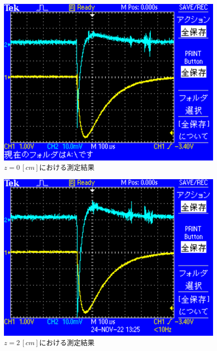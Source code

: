 \begin{figure}[H]
    \centering
    \includegraphics[scale=0.5]{images-1.pdf}
    \caption{$z=0\,[cm]$における測定結果}
\end{figure}

\begin{figure}[H]
    \centering
    \includegraphics[scale=0.5]{images-2.pdf}
    \caption{$z=2\,[cm]$における測定結果}
\end{figure}

